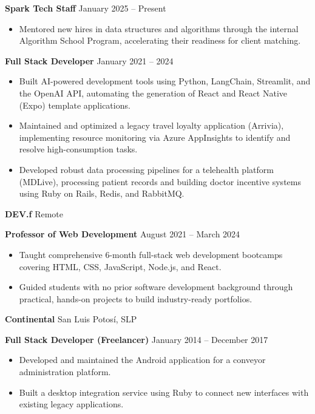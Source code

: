 \documentclass[11pt]{article}
\begin{document}
\vspace{8pt}

\textbf{Spark Tech Staff} \hfill January 2025 – Present
\begin{itemize}[noitemsep, topsep=0pt, partopsep=0pt, parsep=0pt]
    \item Mentored new hires in data structures and algorithms through the internal Algorithm School Program, accelerating their readiness for client matching.
\end{itemize}

\vspace{8pt}

\textbf{Full Stack Developer} \hfill January 2021 – 2024
\begin{itemize}[noitemsep, topsep=0pt, partopsep=0pt, parsep=0pt]
    \item Built AI-powered development tools using Python, LangChain, Streamlit, and the OpenAI API, automating the generation of React and React Native (Expo) template applications.
    \item Maintained and optimized a legacy travel loyalty application (Arrivia), implementing resource monitoring via Azure AppInsights to identify and resolve high-consumption tasks.
    \item Developed robust data processing pipelines for a telehealth platform (MDLive), processing patient records and building doctor incentive systems using Ruby on Rails, Redis, and RabbitMQ.
\end{itemize}

\vspace{8pt}

\textbf{DEV.f} \hfill Remote

\textbf{Professor of Web Development} \hfill August 2021 – March 2024
\begin{itemize}[noitemsep, topsep=0pt, partopsep=0pt, parsep=0pt]
    \item Taught comprehensive 6-month full-stack web development bootcamps covering HTML, CSS, JavaScript, Node.js, and React.
    \item Guided students with no prior software development background through practical, hands-on projects to build industry-ready portfolios.
\end{itemize}

\vspace{8pt}

\textbf{Continental} \hfill San Luis Potosí, SLP

\textbf{Full Stack Developer (Freelancer)} \hfill January 2014 – December 2017
\begin{itemize}[noitemsep, topsep=0pt, partopsep=0pt, parsep=0pt]
    \item Developed and maintained the Android application for a conveyor administration platform.
    \item Built a desktop integration service using Ruby to connect new interfaces with existing legacy applications.
\end{itemize}
\end{document}
